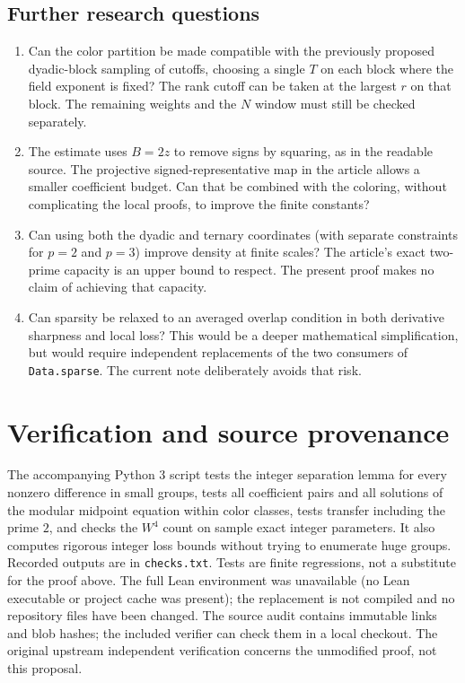 \documentclass[11pt]{article}
\theoremstyle{remark}\newtheorem{remark}[theorem]{Remark}
\newcommand{\src}[1]{\texttt{#1}}
\begin{document}
\subsection{Further research questions}
\begin{enumerate}[leftmargin=*]
\item Can the color partition be made compatible with the previously proposed dyadic-block sampling of cutoffs, choosing a single $T$ on each block where the field exponent is fixed? The rank cutoff can be taken at the largest $r$ on that block. The remaining weights and the $N$ window must still be checked separately.
\item The estimate uses $B=2z$ to remove signs by squaring, as in the readable source. The projective signed-representative map in the article allows a smaller coefficient budget. Can that be combined with the coloring, without complicating the local proofs, to improve the finite constants?
\item Can using both the dyadic and ternary coordinates (with separate constraints for $p=2$ and $p=3$) improve density at finite scales? The article's exact two-prime capacity is an upper bound to respect. The present proof makes no claim of achieving that capacity.
\item Can sparsity be relaxed to an averaged overlap condition in both derivative sharpness and local loss? This would be a deeper mathematical simplification, but would require independent replacements of the two consumers of \src{Data.sparse}. The current note deliberately avoids that risk.
\end{enumerate}

\section{Verification and source provenance}
The accompanying Python 3 script tests the integer separation lemma for every nonzero difference in small groups, tests all coefficient pairs and all solutions of the modular midpoint equation within color classes, tests transfer including the prime $2$, and checks the $W^4$ count on sample exact integer parameters. It also computes rigorous integer loss bounds without trying to enumerate huge groups. Recorded outputs are in \src{checks.txt}. Tests are finite regressions, not a substitute for the proof above. The full Lean environment was unavailable (no Lean executable or project cache was present); the replacement is not compiled and no repository files have been changed. The source audit contains immutable links and blob hashes; the included verifier can check them in a local checkout. The original upstream independent verification \cite{verification} concerns the unmodified proof, not this proposal.
\end{document}
